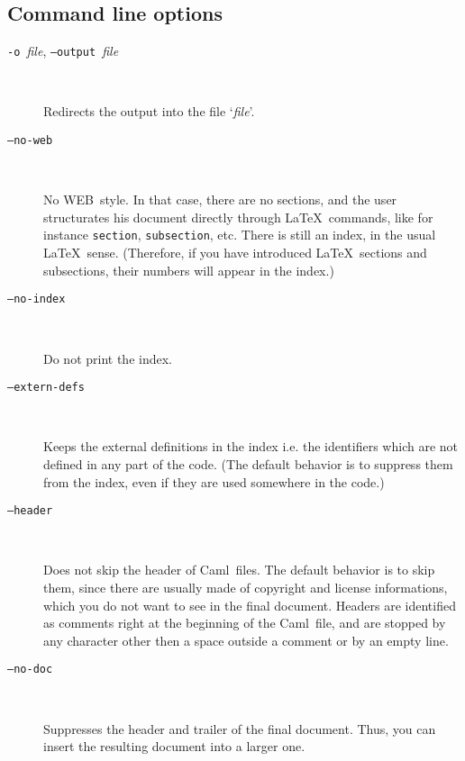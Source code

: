 \documentclass[12pt]{article}
\newcommand{\WEB}{\textsf{WEB}}
\newcommand{\Caml}{\textsf{Caml}}
\begin{document}
\subsection*{Command line options}

\begin{description}

\item[\texttt{-o }\textit{file}, \texttt{--output }\textit{file}] ~\par
  
  Redirects the output into the file `\textit{file}'.

\item[\texttt{--no-web}] ~\par

  No \WEB\ style. In that case, there are no sections, and the user
  structurates his document directly through \LaTeX\ commands, like
  for instance \texttt{section},
  \texttt{subsection}, etc.
  There is still an index, in the usual \LaTeX\ sense. (Therefore, if
  you have introduced \LaTeX\ sections and subsections, their numbers
  will appear in the index.)

\item[\texttt{--no-index}] ~\par
  
  Do not print the index.

\item[\texttt{--extern-defs}] ~\par

  Keeps the external definitions in the index i.e. the identifiers
  which are not defined in any part of the code. (The default behavior
  is to suppress them from the index, even if they are used somewhere
  in the code.)

\item[\texttt{--header}] ~\par

  Does not skip the header of \Caml\ files. The default behavior is to
  skip them, since there are usually made of copyright and license
  informations, which you do not want to see in the final document.
  Headers are identified as comments right at the beginning of the
  \Caml\ file, and are stopped by any character other then a space
  outside a comment or by an empty line. 

\item[\texttt{--no-doc}] ~\par

  Suppresses the header and trailer of the final document. Thus, you can
  insert the resulting document into a larger one.


\end{description}
\end{document}
